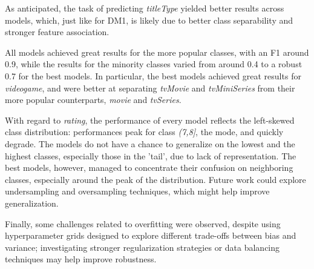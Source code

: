 As anticipated, the task of predicting \textit{titleType} yielded better results across models, which, just like for DM1, is likely due to better class separability and stronger feature association.

All models achieved great results for the more popular classes, with an F1 around 0.9, while the results for the minority classes varied from around 0.4 to a robust 0.7 for the best models. In particular, the best models achieved great results for \textit{videogame}, and were better at separating \textit{tvMovie} and \textit{tvMiniSeries} from their more popular counterparts, \textit{movie} and \textit{tvSeries}.

With regard to \textit{rating}, the performance of every model reflects the left-skewed class distribution: performances peak for class \textit{(7,8]}, the mode, and quickly degrade. The models do not have a chance to generalize on the lowest and the highest classes, especially those in the 'tail', due to lack of representation. The best models, however, managed to concentrate their confusion on neighboring classes, especially around the peak of the distribution. Future work could explore undersampling and oversampling techniques, which might help improve generalization.

Finally, some challenges related to overfitting were observed, despite using hyperparameter grids designed to explore different trade-offs between bias and variance; investigating stronger regularization strategies or data balancing techniques may help improve robustness.